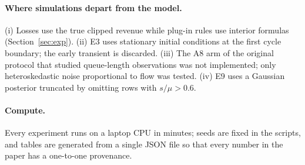 \paragraph{Where simulations depart from the model.} (i) Losses use the true clipped revenue while plug-in rules use interior formulas (Section~\ref{sec:exp}). (ii) E3 uses stationary initial conditions at the first cycle boundary; the early transient is discarded. (iii) The A8 arm of the original protocol that studied queue-length observations was not implemented; only heteroskedastic noise proportional to flow was tested. (iv) E9 uses a Gaussian posterior truncated by omitting rows with $s/\mu>0.6$.

\paragraph{Compute.} Every experiment runs on a laptop CPU in minutes; seeds are fixed in the scripts, and tables are generated from a single JSON file so that every number in the paper has a one-to-one provenance.



